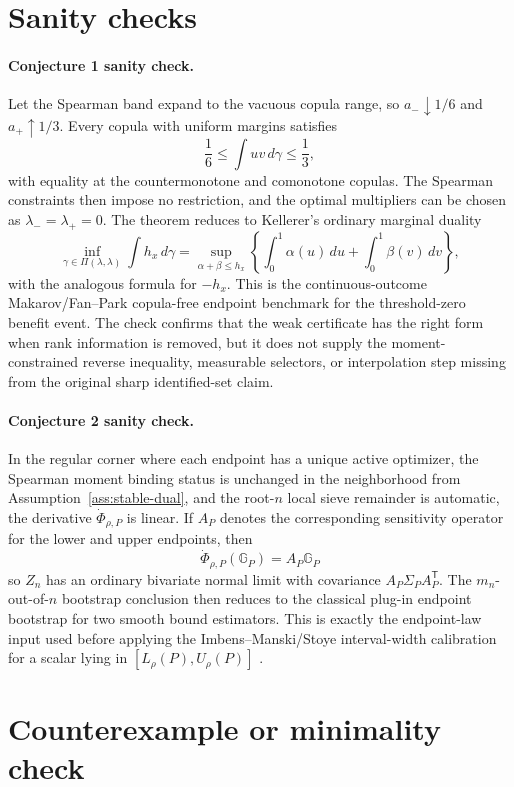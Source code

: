 \documentclass[11pt]{article}
\newcommand{\transpose}{\mathsf{T}}
\theoremstyle{definition}
\theoremstyle{plain}
\theoremstyle{remark}
\begin{document}
\section{Sanity checks}
\paragraph{Conjecture 1 sanity check.}
Let the Spearman band expand to the vacuous copula range, so \(a_-\downarrow1/6\) and \(a_+\uparrow1/3\).  Every copula with uniform margins satisfies
\[
\frac16\le \int uv\,d\gamma\le \frac13,
\]
with equality at the countermonotone and comonotone copulas.  The Spearman constraints then impose no restriction, and the optimal multipliers can be chosen as \(\lambda_-=\lambda_+=0\).  The theorem reduces to Kellerer's ordinary marginal duality
\[
\inf_{\gamma\in\Pi(\lambda,\lambda)}\int h_x\,d\gamma
=
\sup_{\alpha+\beta\le h_x}
\left\{\int_0^1\alpha(u)\,du+\int_0^1\beta(v)\,dv\right\},
\]
with the analogous formula for \(-h_x\).  This is the continuous-outcome Makarov/Fan--Park copula-free endpoint benchmark for the threshold-zero benefit event.  The check confirms that the weak certificate has the right form when rank information is removed, but it does not supply the moment-constrained reverse inequality, measurable selectors, or interpolation step missing from the original sharp identified-set claim.

\paragraph{Conjecture 2 sanity check.}
In the regular corner where each endpoint has a unique active optimizer, the Spearman moment binding status is unchanged in the neighborhood from Assumption~\ref{ass:stable-dual}, and the root-\(n\) local sieve remainder is automatic, the derivative \(\dot\Phi_{\rho,P}\) is linear.  If \(A_P\) denotes the corresponding sensitivity operator for the lower and upper endpoints, then
\[
\dot\Phi_{\rho,P}(\mathbb G_P)=A_P\mathbb G_P
\]
so \(Z_n\) has an ordinary bivariate normal limit with covariance \(A_P\Sigma_PA_P^{\transpose}\).  The \(m_n\)-out-of-\(n\) bootstrap conclusion then reduces to the classical plug-in endpoint bootstrap for two smooth bound estimators.  This is exactly the endpoint-law input used before applying the Imbens--Manski/Stoye interval-width calibration for a scalar lying in \([L_\rho(P),U_\rho(P)]\) \cite{Stoye2009MoreCI}.

\section{Counterexample or minimality check}
\end{document}
